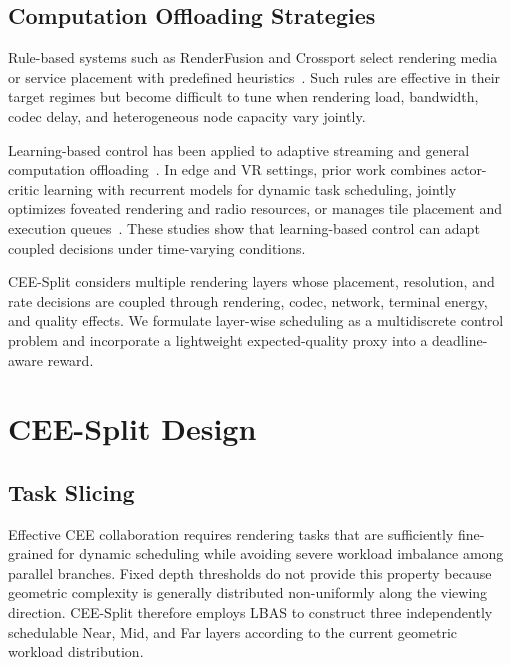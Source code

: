 \documentclass[10pt,journal,compsoc]{IEEEtran}
\begin{document}
\subsection{Computation Offloading Strategies}

Rule-based systems such as RenderFusion and Crossport select rendering media or service placement with predefined heuristics~\cite{lu_renderfusion_2023,su_crossport_2026}. Such rules are effective in their target regimes but become difficult to tune when rendering load, bandwidth, codec delay, and heterogeneous node capacity vary jointly.

Learning-based control has been applied to adaptive streaming and general computation offloading~\cite{schulman_proximal_2017,mao_neural_2017,huang_deep_2020,tang_deep_2025,yang_dqn_2022}. In edge and VR settings, prior work combines actor-critic learning with recurrent models for dynamic task scheduling, jointly optimizes foveated rendering and radio resources, or manages tile placement and execution queues~\cite{tuli_dynamic_2022,nyamtiga_adaptive_2024,xu_wireless_2025,saha_deep_2026}. These studies show that learning-based control can adapt coupled decisions under time-varying conditions.

CEE-Split considers multiple rendering layers whose placement, resolution, and rate decisions are coupled through rendering, codec, network, terminal energy, and quality effects. We formulate layer-wise scheduling as a multidiscrete control problem and incorporate a lightweight expected-quality proxy into a deadline-aware reward.

\section{CEE-Split Design}
\label{sec:design}

\subsection{Task Slicing}

Effective CEE collaboration requires rendering tasks that are sufficiently fine-grained for dynamic scheduling while avoiding severe workload imbalance among parallel branches. Fixed depth thresholds do not provide this property because geometric complexity is generally distributed non-uniformly along the viewing direction. CEE-Split therefore employs LBAS to construct three independently schedulable Near, Mid, and Far layers according to the current geometric workload distribution.
\end{document}
